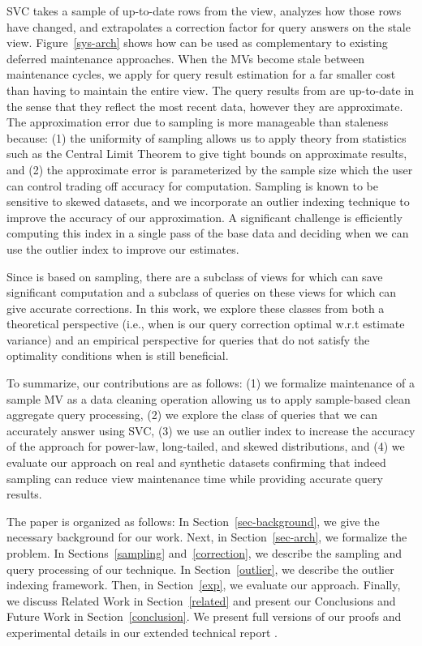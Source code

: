 SVC takes a sample of up-to-date rows from the view, analyzes how those rows have changed, and extrapolates a correction factor for query answers on the stale view. Figure~\ref{sys-arch} shows how \svc can be used as complementary to existing deferred maintenance approaches. 
When the MVs become stale between maintenance cycles, we apply \svc for query result estimation for a far smaller cost than having to maintain the entire view.
The query results from \svc are up-to-date in the sense that they reflect the most recent data, however they are approximate. 
The approximation error due to sampling is more manageable than staleness because: (1) the uniformity of sampling allows us to apply theory from statistics such as the Central Limit Theorem to give tight bounds on approximate results, and (2) the approximate error is parameterized by the sample size which the user can control trading off accuracy for computation.
Sampling is known to be sensitive to skewed datasets, and we incorporate an outlier indexing technique to improve the accuracy of our approximation.
A significant challenge is efficiently computing this index in a single pass of the base data and deciding when we can use the outlier index to improve our estimates.


Since \svc is based on sampling, there are a subclass of views for which \svc can save significant computation and a subclass of queries on these views for which \svc can give accurate corrections.
In this work, we explore these classes from both a theoretical perspective (i.e., when is our query correction optimal w.r.t estimate variance) and an empirical perspective for queries that do not satisfy the optimality conditions when is \svc still beneficial.

To summarize, our contributions are as follows: (1) we formalize maintenance of a sample MV as a data cleaning operation allowing us to apply sample-based clean aggregate query processing, (2) we explore the class of queries that we can accurately answer using SVC, (3) we use an outlier index to increase the accuracy of the approach for power-law, long-tailed, and skewed distributions, and (4) we evaluate our approach on real and synthetic datasets confirming that indeed sampling can reduce view maintenance time while providing accurate query results. 

The paper is organized as follows: 
In Section~\ref{sec-background}, we give the necessary background for our work.
Next, in Section~\ref{sec-arch}, we formalize the problem.
In Sections~\ref{sampling} and~\ref{correction}, we describe the sampling and query processing of our technique.
In Section~\ref{outlier}, we describe the outlier indexing framework.
Then, in Section~\ref{exp}, we evaluate our approach.
Finally, we discuss Related Work in Section~\ref{related} and present our Conclusions and Future Work in Section~\ref{conclusion}.
We present full versions of our proofs and experimental details in our extended technical report \cite{technicalReport}.
